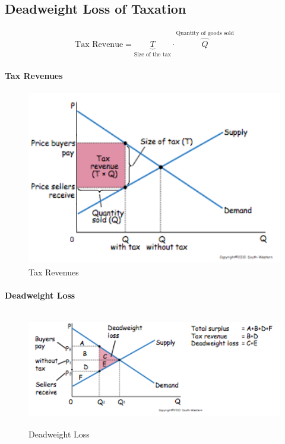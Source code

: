 \documentclass[a4paper,titlepage] {scrartcl}
\begin{document}
\subsection{Deadweight Loss of Taxation} %
\label{sub:deadweight_loss_of_taxation}
\begin{eqnarray*}
	\text{Tax Revenue} = \underbrace{T}_{\text{Size of the tax}} 
						\cdot 
						\overbrace{Q}^{\text{Quantity of goods sold}} 
\end{eqnarray*}

\paragraph{Tax Revenues} %
\label{par:tax_revenues}
\begin{figure}[htbp]
	\centering
		\includegraphics[height=3in]{images/taxRev.png}
	\caption{Tax Revenues}
	\label{fig:images_taxRev}
\end{figure}


\paragraph{Deadweight Loss} %
\label{par:deadweight_loss}
\begin{figure}[htbp]
	\centering
		\includegraphics[height=2in]{images/deadweightLoss.png}
	\caption{Deadweight Loss}
	\label{fig:images_deadweightLoss}
\end{figure}
\end{document}
